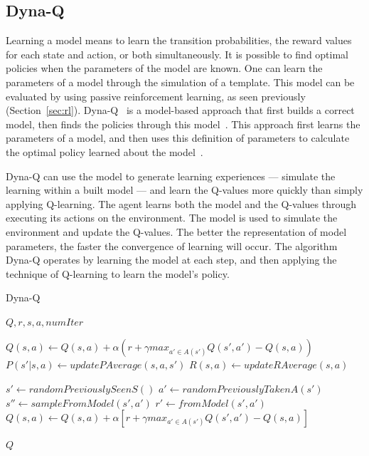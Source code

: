\subsection{Dyna-Q}
\label{subsec:dynaq}

Learning a model means to learn the transition probabilities, the reward values for each state and action, or both simultaneously.
It is possible to find optimal policies when the parameters of the model are known.
One can learn the parameters of a model through the simulation of a template.
This model can be evaluated by using passive reinforcement learning, as seen previously (Section~\ref{sec:rl}).
Dyna-Q~\cite{sutton1991dyna} is a model-based approach that first builds a correct model, then finds the policies through this model~\cite{kaelbling1996reinforcement}.
This approach first learns the parameters of a model, and then uses this definition of parameters to calculate the optimal policy learned about the model~\cite{amato2010highlevel}.

Dyna-Q can use the model to generate learning experiences --- simulate the learning within a built model --- and learn the Q-values more quickly than simply applying Q-learning.
The agent learns both the model and the Q-values through executing its actions on the environment.
The model is used to simulate the environment and update the Q-values.
The better the representation of model parameters, the faster the convergence of learning will occur.
The algorithm Dyna-Q operates by learning the model at each step, and then applying the technique of Q-learning to learn the model's policy.

\begin{algorithm}
	\caption{Dyna-Q}
	\label{alg:dynaQ}
	\begin{algorithmic}[1]
		\REQUIRE $Q, r, s, a, numIter$
		\item[]
		\STATE $Q(s,a) \gets Q(s,a) + \alpha(r + \gamma max_{a' \in A(s')}Q(s',a') - Q(s,a))$
		\STATE $P(s'|s,a) \gets updatePAverage(s,a,s')$
		\STATE $R(s,a) \gets updateRAverage(s,a)$
		\item[]
        	\STATE $s' \gets randomPreviouslySeenS()$
        	\STATE $a' \gets randomPreviouslyTakenA(s')$
        	\STATE $s'' \gets sampleFromModel(s',a')$
        	\STATE $r' \gets fromModel(s',a')$
        	\STATE $Q(s,a) \leftarrow Q(s,a) + \alpha[r + \gamma max_{a' \in A(s')}Q(s',a') - Q(s,a)]$
		\ENDFOR
		\item[]
		\RETURN $Q$
	\end{algorithmic}
\end{algorithm}

